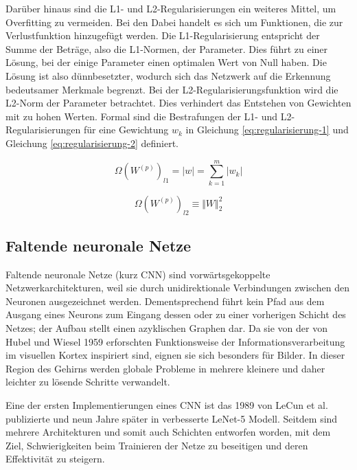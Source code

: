 \mypar Darüber hinaus sind die L1- und L2-Regularisierungen ein weiteres Mittel, um Overfitting zu vermeiden. Bei den Dabei handelt es sich um Funktionen, die zur Verlustfunktion hinzugefügt werden. Die L1-Regularisierung entspricht der Summe der Beträge, also die L1-Normen, der Parameter. Dies führt zu einer Lösung, bei der einige Parameter einen optimalen Wert von Null haben. Die Lösung ist also dünnbesetzter, wodurch sich das Netzwerk auf die Erkennung bedeutsamer Merkmale begrenzt. Bei der L2-Regularisierungsfunktion wird die L2-Norm der Parameter betrachtet. Dies verhindert das Entstehen von Gewichten mit zu hohen Werten. Formal sind die Bestrafungen der L1- und L2-Regularisierungen für eine Gewichtung $w_k$ in Gleichung \ref{eq:regularisierung-1} und Gleichung \ref{eq:regularisierung-2} definiert. \cite{deep-neural-network-regularization}

\begin{equation}\label{eq:regularisierung-1}
\Omega (W^{(p)})_{l1} = \vert w \vert  = \sum_{k=1}^{m} \vert w_k \vert
\end{equation}

\begin{equation}\label{eq:regularisierung-2}
\Omega(W^{(p)})_{l2} \equiv \Vert W \Vert^2_2
\end{equation}


\subsection{Faltende neuronale Netze}
Faltende neuronale Netze (kurz CNN) sind vorwärtsgekoppelte Netzwerkarchitekturen, weil sie durch unidirektionale Verbindungen zwischen den Neuronen ausgezeichnet werden. Dementsprechend führt kein Pfad aus dem Ausgang eines Neurons zum Eingang dessen oder zu einer vorherigen Schicht des Netzes; der Aufbau stellt einen azyklischen Graphen dar. Da sie von der von Hubel und Wiesel 1959 \cite{hubel-wiesel} erforschten Funktionsweise der Informationsverarbeitung im visuellen Kortex inspiriert sind, eignen sie sich besonders für Bilder. In dieser Region des Gehirns werden globale Probleme in mehrere kleinere und daher leichter zu lösende Schritte verwandelt. \cite{Deep-Learning-mit-tf-keras-und-tfjs}

\mypar Eine der ersten Implementierungen eines CNN ist das 1989 von LeCun et al. \cite{lenet-1} publizierte und neun Jahre später in \cite{lenet-2} verbesserte LeNet-5 Modell. Seitdem sind mehrere Architekturen und somit auch Schichten entworfen worden, mit dem Ziel, Schwierigkeiten beim Trainieren der Netze zu beseitigen und deren Effektivität zu steigern. \cite{recent-advances-in-cnns}



